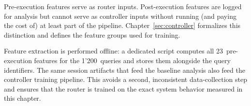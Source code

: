 Pre-execution features serve as router inputs. Post-execution features are
logged for analysis but cannot serve as controller inputs without running
(and paying the cost of) at least part of the pipeline.
Chapter~\ref{sec:controller} formalizes this distinction and defines the
feature groups used for training.


Feature extraction is performed offline: a dedicated script computes all
23~pre-execution features for the 1{'}200~queries and stores them alongside the
query identifiers. The same session artifacts that feed the baseline analysis
also feed the controller training pipeline. This avoids a second, inconsistent
data-collection step and ensures that the router is trained on the exact system
behavior measured in this chapter.

















